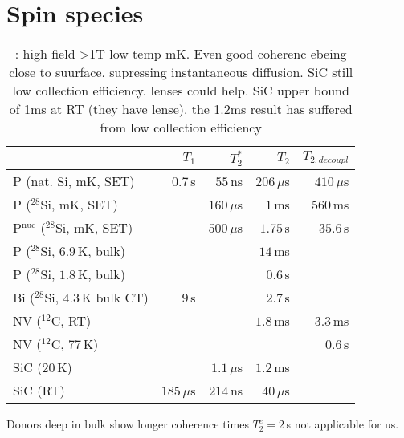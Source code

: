 
\section{Spin species}


\begin{table}
\begin{tabular}{lrrrr}
	& $T_1$ & $T_2^{*}$ & $T_2$ & $T_{2, decoupl}$ \\ \hline
P (nat. Si, mK, SET) \cite{Pla2012}& $0.7\, $s & $55\, $ns  & $206\, \mu$s & $410\, \mu$s  \\
P ($^{28}$Si, mK, SET) \cite{Muhonen2014}&  & $160\, \mu$s  & $1\, $ms & $560\, $ms \\
P$^{\text{nuc}}$ ($^{28}$Si, mK, SET) \cite{Muhonen2014}& & $500\, \mu$s & $1.75\, $s & $35.6\, $s \\
P ($^{28}$Si, $6.9\, $K, bulk) \cite{Morley2010}& &  & $14\, $ms &  \\
P ($^{28}$Si, $1.8\, $K, bulk) \cite{Tyryshkin2011}& &  & $0.6\, $s &  \\
Bi ($^{28}$Si, $4.3\, $K bulk CT) \cite{Wolfowicz2013} & $9\, $s &  & $2.7\, $s &\\
NV ($^{12}$C, RT) \cite{Balasubramanian2009,Bar-Gill2013} & & & $1.8\, $ms & $3.3\, $ms \\
NV ($^{12}$C, $77\, $K) \cite{Bar-Gill2013} & & &  & $0.6\, $s \\
SiC ($20\, $K) \cite{Christle2014} & & $1.1\, \mu$s & $1.2\, $ms &  \\
SiC (RT) \cite{Koehl2011} & $185\, \mu$s & $214\, $ns & $40\, \mu$s &   \\
\hline
\end{tabular} 
\caption{\cite{Pla2012,Muhonen2014}: high field >1T low temp mK. Even good coherenc ebeing close to suurface. \cite{Tyryshkin2011} supressing instantaneous diffusion. SiC still low collection efficiency. lenses could help. SiC upper bound of 1ms at RT \cite{Widmann2014} (they have lense). the 1.2ms result has suffered from low collection efficiency}
\label{TAB:qubits}
\end{table}

Donors deep in bulk show longer coherence times $T_2^e=2\, $s \cite{Tyryshkin2011} not applicable for us.

